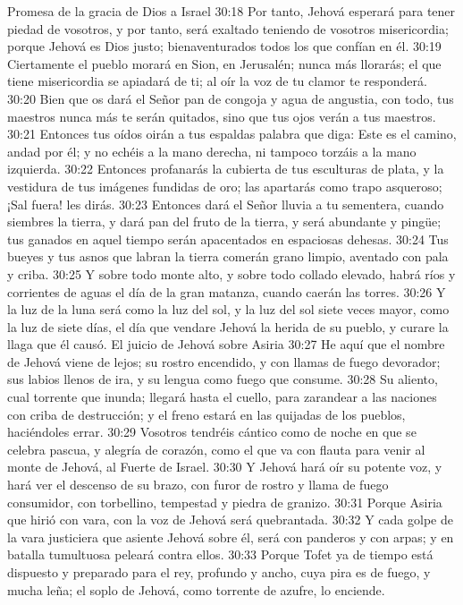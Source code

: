 Promesa de la gracia de Dios a Israel  
30:18 Por tanto, Jehová esperará para tener piedad de vosotros, y por tanto, será exaltado teniendo de vosotros misericordia; porque Jehová es Dios justo; bienaventurados todos los que confían en él.  
30:19 Ciertamente el pueblo morará en Sion, en Jerusalén; nunca más llorarás; el que tiene misericordia se apiadará de ti; al oír la voz de tu clamor te responderá.  
30:20 Bien que os dará el Señor pan de congoja y agua de angustia, con todo, tus maestros nunca más te serán quitados, sino que tus ojos verán a tus maestros.  
30:21 Entonces tus oídos oirán a tus espaldas palabra que diga: Este es el camino, andad por él; y no echéis a la mano derecha, ni tampoco torzáis a la mano izquierda.  
30:22 Entonces profanarás la cubierta de tus esculturas de plata, y la vestidura de tus imágenes fundidas de oro; las apartarás como trapo asqueroso; ¡Sal fuera! les dirás.  
30:23 Entonces dará el Señor lluvia a tu sementera, cuando siembres la tierra, y dará pan del fruto de la tierra, y será abundante y pingüe; tus ganados en aquel tiempo serán apacentados en espaciosas dehesas.  
30:24 Tus bueyes y tus asnos que labran la tierra comerán grano limpio, aventado con pala y criba.  
30:25 Y sobre todo monte alto, y sobre todo collado elevado, habrá ríos y corrientes de aguas el día de la gran matanza, cuando caerán las torres.  
30:26 Y la luz de la luna será como la luz del sol, y la luz del sol siete veces mayor, como la luz de siete días, el día que vendare Jehová la herida de su pueblo, y curare la llaga que él causó.  
El juicio de Jehová sobre Asiria  
30:27 He aquí que el nombre de Jehová viene de lejos; su rostro encendido, y con llamas de fuego devorador; sus labios llenos de ira, y su lengua como fuego que consume.  
30:28 Su aliento, cual torrente que inunda; llegará hasta el cuello, para zarandear a las naciones con criba de destrucción; y el freno estará en las quijadas de los pueblos, haciéndoles errar.  
30:29 Vosotros tendréis cántico como de noche en que se celebra pascua, y alegría de corazón, como el que va con flauta para venir al monte de Jehová, al Fuerte de Israel.  
30:30 Y Jehová hará oír su potente voz, y hará ver el descenso de su brazo, con furor de rostro y llama de fuego consumidor, con torbellino, tempestad y piedra de granizo.  
30:31 Porque Asiria que hirió con vara, con la voz de Jehová será quebrantada.  
30:32 Y cada golpe de la vara justiciera que asiente Jehová sobre él, será con panderos y con arpas; y en batalla tumultuosa peleará contra ellos.  
30:33 Porque Tofet ya de tiempo está dispuesto y preparado para el rey, profundo y ancho, cuya pira es de fuego, y mucha leña; el soplo de Jehová, como torrente de azufre, lo enciende.  

